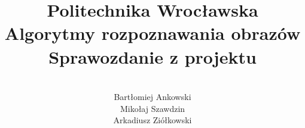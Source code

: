 \documentclass[a4paper,12pt]{article}
\title{\Huge \textbf{Politechnika Wrocławska\\[0.3in]} 
  \huge Algorytmy rozpoznawania obrazów \\[0.2in]
  \LARGE Sprawozdanie z projektu
}
\date{}
\author{
 	\quad	\\
  Bartłomiej Ankowski\\
  Mikołaj Szawdzin\\
  Arkadiusz Ziółkowski\\
}
\begin{document}
\maketitle
\pagebreak

\tableofcontents
\pagebreak






\end{document}
